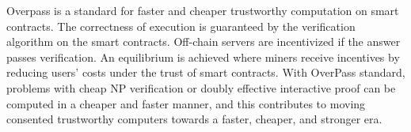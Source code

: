 Overpass is a standard for faster and cheaper trustworthy computation on smart contracts. The correctness of execution is guaranteed by the verification algorithm on the smart contracts. Off-chain servers are incentivized if the answer passes verification. An equilibrium is achieved where miners receive incentives by reducing users’ costs under the trust of smart contracts. With OverPass standard, problems with cheap NP verification or doubly effective interactive proof can be computed in a cheaper and faster manner, and this contributes to moving consented trustworthy computers towards a faster, cheaper, and stronger era.